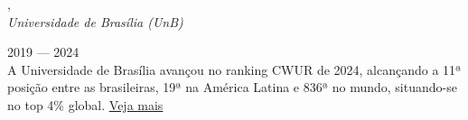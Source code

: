 , \\
\textit{Universidade de Brasília (UnB)}\strut \hfill 2019 --- 2024\\

\vspace*{7pt}
A Universidade de Brasília avançou no ranking CWUR de 2024, alcançando a 11ª posição entre as brasileiras, 19ª na América Latina e 836ª no mundo, situando-se no top 4\% global. \href{https://cwur.org/2024/university-of-brasilia.php}{Veja mais}